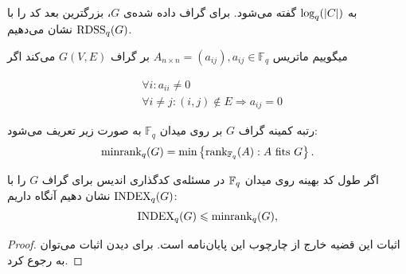به
$\log_q(\left|{C}\right|)$
 گفته می‌شود. برای گراف داده شده‌ی $G$، بزرگترین بعد کد را با
 $\mathrm{RDSS}_q(G)$
 نشان می‌دهیم.
  \begin{definition}
  	میگوییم ماتریس
  	$A_{n \times n} = (a_{ij}), a_{ij} \in \mathbb{F}_q$
  	بر گراف
  	$G(V, E)$
  	می‌کند اگر 
  	\begin{latin}
  		\begin{align*}
  			& \forall i : a_{ii} \ne 0 \\
  			& \forall i \ne j:  (i, j) \notin E \Rightarrow a_{ij} = 0
  		\end{align*}
  	\end{latin}
  \end{definition}
 \begin{definition}
	 \label{def:minrank}
 	رتبه کمینه گراف
 	$G$
 	بر روی میدان
 	$\mathbb{F}_q$
 	به صورت زیر تعریف می‌شود:
 	\begin{equation}
 		\mathrm{minrank}_q(G) = \min\left\{ \operatorname{rank}_{\mathbb{F}_q}(A): A \text{ fits } G \right\}.
 	\end{equation}
 \end{definition}
 \begin{theorem}
	 \label{thm:minranl}
	 اگر طول کد بهینه روی میدان
	 $\mathbb{F}_q$
	  در مسئله‌ی کدگذاری اندیس برای گراف
	 $G$
	 را با
	 $\mathrm{INDEX}_q(G)$
	 نشان دهیم آنگاه داریم:
 	\begin{equation}
 		\mathrm{INDEX}_q(G) \leqslant \mathrm{minrank}_q(G),
 		\label{eq:bary}
 	\end{equation} 
 \end{theorem}
 \begin{proof}
 		اثبات این قضیه خارج از چارچوب این پایان‌نامه است. برای دیدن اثبات می‌توان به
 	\cite{4031356}
 	رجوع کرد.
 \end{proof}
